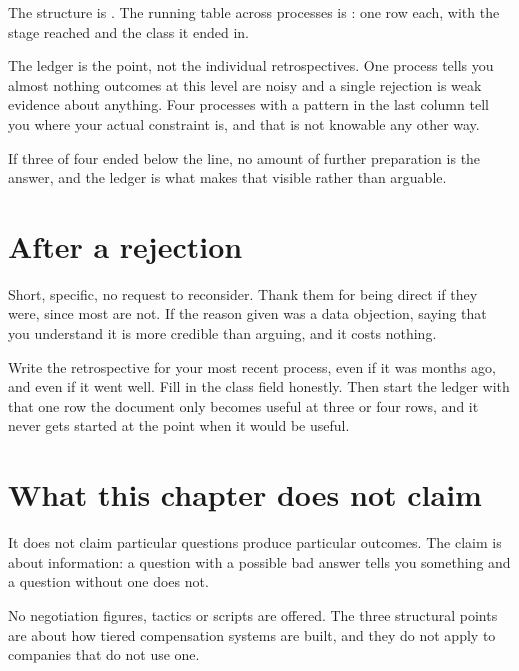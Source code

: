 The structure is . The running table across
processes is : one row each, with the stage
reached and the class it ended in.

\begin{kitnote}
The ledger is the point, not the individual retrospectives. One process tells
you almost nothing \dash{} outcomes at this level are noisy and a single
rejection is weak evidence about anything. Four processes with a pattern in the
last column tell you where your actual constraint is, and that is not knowable
any other way.

If three of four ended below the line, no amount of further preparation is the
answer, and the ledger is what makes that visible rather than arguable.
\end{kitnote}

\section{After a rejection}

Short, specific, no request to reconsider. Thank them for being direct if they
were, since most are not. If the reason given was a data objection, saying that
you understand it is more credible than arguing, and it costs nothing.


\begin{drill}
Write the retrospective for your most recent process, even if it was months
ago, and even if it went well. Fill in the class field honestly. Then start the
ledger with that one row \dash{} the document only becomes useful at three or
four rows, and it never gets started at the point when it would be useful.
\end{drill}

\section*{What this chapter does not claim}

It does not claim particular questions produce particular outcomes. The claim
is about information: a question with a possible bad answer tells you something
and a question without one does not.

No negotiation figures, tactics or scripts are offered. The three structural
points are about how tiered compensation systems are built, and they do not
apply to companies that do not use one.
